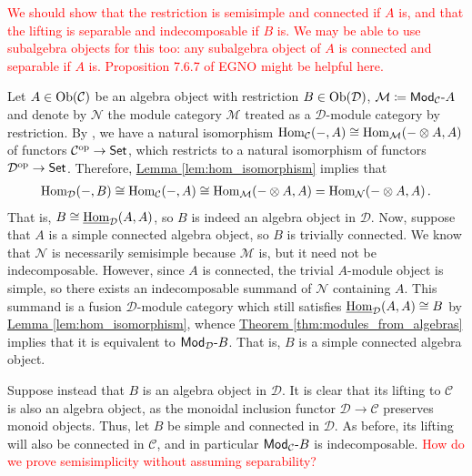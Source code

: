 \documentclass[12pt, reqno]{amsart}
\numberwithin{equation}{section}
\theoremstyle{plainspace}
\theoremstyle{definitionspace}
\theoremstyle{remarkspace}
\renewenvironment{proof}{{\noindent\textbf{Proof.}}}{\null\hfill\qedsymbol}
\newcommand{\mathcat}[1]{\mathcal{#1}}
\newcommand{\Ob}{\textup{Ob}}
\newcommand{\Hom}[2][]{
	\ifthenelse{\equal{#2}{}}
		{\textup{Hom}_{#1}}
		{\textup{Hom}_{#1}\!\left(#2\right)}
}
\newcommand{\IntHom}[2][]{
	\ifthenelse{\equal{#2}{}}
		{\underline{\textup{Hom}}_{#1}}
		{\underline{\textup{Hom}}_{#1}\!\left(#2\right)}
}
\newcommand{\opcat}[1]{{#1}^{\textup{op}}}
\newcommand{\textcat}[1]{\textup{\textsf{#1}}}
\newcommand{\rmodcat}[2][]{\textcat{Mod}_{#1}\textcat{-}#2}
\begin{document}
\noindent \textcolor{red}{We should show that the restriction is semisimple and connected if $A$ is, and that the lifting is separable and indecomposable if $B$ is. We may be able to use subalgebra objects for this too: any subalgebra object of $A$ is connected and separable if $A$ is. Proposition 7.6.7 of EGNO might be helpful here.}
\newline

\begin{proof}
\noindent Let $A \in \Ob(\mathcat{C})$ be an algebra object with restriction $B \in \Ob(\mathcat{D})$, $\mathcat{M} \coloneqq \rmodcat[\mathcat{C}]{A}$ and denote by $\mathcat{N}$ the module category $\mathcat{M}$ treated as a $\mathcat{D}$-module category by restriction. By \cite[Lemma 7.8.12]{Etingof_2016}, we have a natural isomorphism $\Hom[\mathcat{C}]{-, A} \cong \Hom[\mathcat{M}]{- \otimes A, A}$ of functors $\opcat{\mathcat{C}} \to \textcat{Set}$, which restricts to a natural isomorphism of functors $\opcat{\mathcat{D}} \to \textcat{Set}$. Therefore, \hyperref[lem:hom_isomorphism]{Lemma \ref*{lem:hom_isomorphism}} implies that
\begin{align*}
\begin{split}
\Hom[\mathcat{D}]{-, B} \cong \Hom[\mathcat{C}]{-, A} \cong \Hom[\mathcat{M}]{- \otimes A, A} = \Hom[\mathcat{N}]{- \otimes A, A}.
\end{split}
\end{align*}
\noindent That is, $B \cong \IntHom[\mathcat{D}]{A, A}$, so $B$ is indeed an algebra object in $\mathcat{D}$. Now, suppose that $A$ is a simple connected algebra object, so $B$ is trivially connected. We know that $\mathcat{N}$ is necessarily semisimple because $\mathcat{M}$ is, but it need not be indecomposable. However, since $A$ is connected, the trivial $A$-module object is simple, so there exists an indecomposable summand of $\mathcat{N}$ containing $A$. This summand is a fusion $\mathcat{D}$-module category which still satisfies $\IntHom[\mathcat{D}]{A, A} \cong B$ by \hyperref[lem:hom_isomorphism]{Lemma \ref*{lem:hom_isomorphism}}, whence \hyperref[thm:modules_from_algebras]{Theorem \ref*{thm:modules_from_algebras}} implies that it is equivalent to $\rmodcat[\mathcat{D}]{B}$. That is, $B$ is a simple connected algebra object.
\newline

\noindent Suppose instead that $B$ is an algebra object in $\mathcat{D}$. It is clear that its lifting to $\mathcat{C}$ is also an algebra object, as the monoidal inclusion functor $\mathcat{D} \to \mathcat{C}$ preserves monoid objects. Thus, let $B$ be simple and connected in $\mathcat{D}$. As before, its lifting will also be connected in $\mathcat{C}$, and in particular $\rmodcat[\mathcat{C}]{B}$ is indecomposable. \textcolor{red}{How do we prove semisimplicity without assuming separability?}
\end{proof}
\newline
\end{document}
